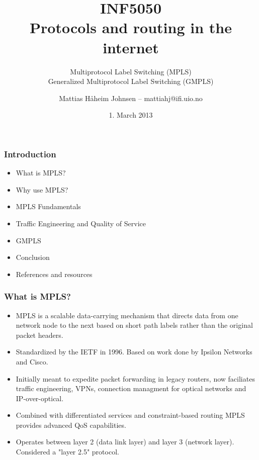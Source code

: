 \documentclass[12pt]{beamer}
\title[]{INF5050 \\ Protocols and routing in the internet}
\subtitle[]{Multiprotocol Label Switching (MPLS) \\ Generalized Multiprotocol Label Switching (GMPLS)}
\author{Mattias H{\aa}heim Johnsen -- mattiahj@ifi.uio.no}
\date{1. March 2013}
\begin{document}
\begin{frame}
    \titlepage
\end{frame}

\begin{frame}
  \frametitle{Introduction}
  \begin{itemize}
  \item What is MPLS?
  \item Why use MPLS?
  \item MPLS Fundamentals
  \item Traffic Engineering and Quality of Service
  \item GMPLS
  \item Conclusion
  \item References and resources
  \end{itemize}
\end{frame}

\begin{frame}
  \frametitle{What is MPLS?}
  \begin{itemize}
    \item MPLS is a scalable data-carrying mechanism that directs data from one network node to the next based on short path labels rather than the original packet headers.
    \item Standardized by the IETF in 1996. Based on work done by Ipsilon Networks and Cisco.
    \item Initially meant to expedite packet forwarding in legacy routers, now faciliates traffic engineering, VPNs, connection managment for optical networks and IP-over-optical.
    \item Combined with differentiated services and constraint-based routing MPLS provides advanced QoS capabilities.
    \item Operates between layer 2 (data link layer) and layer 3 (network layer). Considered a "layer 2.5" protocol.
  \end{itemize}
\end{frame}
\end{document}
